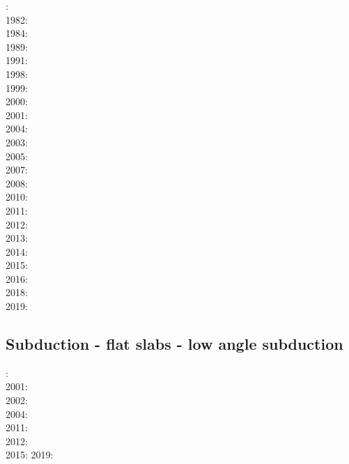 {\scriptsize
{}: \cite{bird78}\\
1982: \cite{clwv82}\\
1984: \cite{cade84}\\
1989: \cite{clwv89}\\
1991: \cite{muph91}\\
1998: \cite{togu98}\\
1999: \cite{fagd99}\\
2000: \cite{pybf00}\\
2001: \cite{dohe01}\cite{reyb01}\cite{brry01}\\
2004: \cite{ster04}\cite{guhl04}\cite{solo04}\\
2003: \cite{hags03}\\
2005: \cite{bihi05}\\
2007: \cite{kore07}\\
2008: \cite{uegs08}\\
2010: \cite{nigm10}\cite{bucl10}\\
2011: \cite{bagw11}\cite{nigm11}\\
2012: \cite{stri12}\\
2013: \cite{dyge13}\cite{mana13}\cite{kore13}\\
2014: \cite{recf14}\cite{macg14}\\
2015: \cite{matv15}\cite{pebu15}\cite{vapm15}\\
2016: \cite{crta16}\\
2018: \cite{zhlg18}\cite{basq18}\\
2019: \cite{begb19}\cite{gubg19}\cite{ulcw19}
}

\subsection{Subduction - flat slabs - low angle subduction}

{\scriptsize
{}: \cite{vavv00}\\
2001: \cite{vavv01}\\
2002: \cite{vavv02}\cite{vavv02b}\\
2004: \cite{vavv04d}\\
2011: \cite{cube11}\\
2012: \cite{mapm12}\\
2015: \cite{gehm15}\cite{tarn15}
2019: \cite{sifg19}\cite{sams19b}
}
